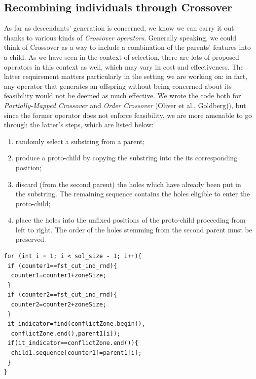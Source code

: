 \documentclass[letterpaper, 10 pt, conference]{ieeeconf}  %
\begin{document}
\subsection{Recombining individuals through Crossover}
As far as descendants' generation is concerned, we know we can carry it out thanks to various kinds of \textit{Crossover operators}. Generally speaking, we
could think of Crossover as a way to include a combination of the parents' features into a child. As we have seen in the context of selection, there are lots of proposed operators in this context as well, which may vary in cost and
effectiveness. The latter requirement matters particularly in the setting we are working on: in fact, any operator that generates an offspring without being concerned about its feasibility would not be deemed as much effective.
We wrote the code both for \textit{Partially-Mapped Crossover} and \textit{Order Crossover} (Oliver et al., Goldberg)), but since the former operator does not enforce feasibility, we are more amenable to go through the latter's steps, which are listed below:
\begin{enumerate}
\item randomly select a substring from a parent;
\item produce a proto-child by copying the substring into the
its corresponding position;
\item discard (from the second parent) the holes which have already been put in the substring. The remaining sequence contains the holes eligible to enter the proto-child;
\item place the holes into the unfixed positions of the proto-child proceeding from left to right. The order of the holes stemming from the second parent must be preserved.
\end{enumerate}


\begin{lstlisting}[caption={Order Crossover, in \texttt{TSPCrossover.cpp}}]
for (int i = 1; i < sol_size - 1; i++){
 if (counter1==fst_cut_ind_rnd){
  counter1=counter1+zoneSize;
 }
 if (counter2==fst_cut_ind_rnd){
  counter2=counter2+zoneSize;
 }
 it_indicator=find(conflictZone.begin(),
  conflictZone.end(),parent1[i]);
 if(it_indicator==conflictZone.end()){
  child1.sequence[counter1]=parent1[i]; 		                          
 }
}		
\end{lstlisting}
\end{document}
